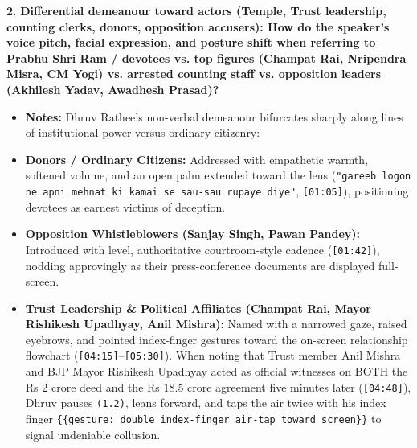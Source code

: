 \documentclass[10pt,a4paper]{article}
\begin{document}
\noindent\textbf{2.} \textbf{Differential demeanour toward actors (Temple, Trust leadership, counting clerks, donors, opposition accusers): How do the speaker's voice pitch, facial expression, and posture shift when referring to Prabhu Shri Ram / devotees vs. top figures (Champat Rai, Nripendra Misra, CM Yogi) vs. arrested counting staff vs. opposition leaders (Akhilesh Yadav, Awadhesh Prasad)?}\par\smallskip
\begin{itemize}
  \item \textbf{Notes:}
Dhruv Rathee's non-verbal demeanour bifurcates sharply along lines of institutional power versus ordinary citizenry:\par\smallskip
  \item \textbf{Donors / Ordinary Citizens:} Addressed with empathetic warmth, softened volume, and an open palm extended toward the lens (\texttt{"gareeb logon ne apni mehnat ki kamai se sau-sau rupaye diye"}, \texttt{[01:05]}), positioning devotees as earnest victims of deception.
  \item \textbf{Opposition Whistleblowers (Sanjay Singh, Pawan Pandey):} Introduced with level, authoritative courtroom-style cadence (\texttt{[01:42]}), nodding approvingly as their press-conference documents are displayed full-screen.
  \item \textbf{Trust Leadership \& Political Affiliates (Champat Rai, Mayor Rishikesh Upadhyay, Anil Mishra):} Named with a narrowed gaze, raised eyebrows, and pointed index-finger gestures toward the on-screen relationship flowchart (\texttt{[04:15]}--\texttt{[05:30]}). When noting that Trust member Anil Mishra and BJP Mayor Rishikesh Upadhyay acted as official witnesses on BOTH the Rs 2 crore deed and the Rs 18.5 crore agreement five minutes later (\texttt{[04:48]}), Dhruv pauses \texttt{(1.2)}, leans forward, and taps the air twice with his index finger \texttt{\{\{gesture: double index-finger air-tap toward screen\}\}} to signal undeniable collusion.
\end{itemize}
\end{document}
